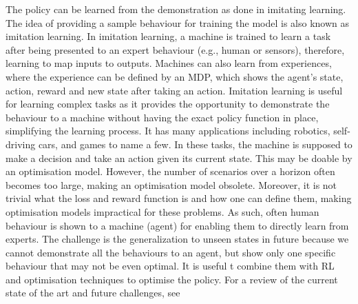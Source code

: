 \documentclass[graybox]{svmult}
\begin{document}
The policy can be learned from the demonstration as done in imitating learning. The idea of providing a sample behaviour for training the model is also known as imitation learning. In imitation learning, a machine is trained to learn a task after being presented to an expert behaviour (e.g., human or sensors), therefore, learning to map inputs to outputs. Machines can also learn from experiences, where the experience can be defined by an MDP, which shows the agent's state, action, reward and new state after taking an action. Imitation learning is useful for learning complex tasks as it provides the opportunity to demonstrate the behaviour to a machine without having the exact policy function in place, simplifying the learning process. It has many applications including robotics, self-driving cars, and games to name a few. In these tasks, the machine is supposed to make a decision and take an action given its current state. This may be doable by an optimisation model. However, the number of scenarios over a horizon often becomes too large, making an optimisation model obsolete. Moreover, it is not trivial what the loss and reward function is and how one can define them, making optimisation models impractical for these problems. As such, often human behaviour is shown to a machine (agent) for enabling them to directly learn from experts. The challenge is the generalization to unseen states in future because we cannot demonstrate all the behaviours to an agent, but show only one specific behaviour that may not be even optimal. It is useful t combine them with RL and optimisation techniques to optimise the policy. For a review of the current state of the art and future challenges, see \cite{Hussein2017-tb}
\end{document}
